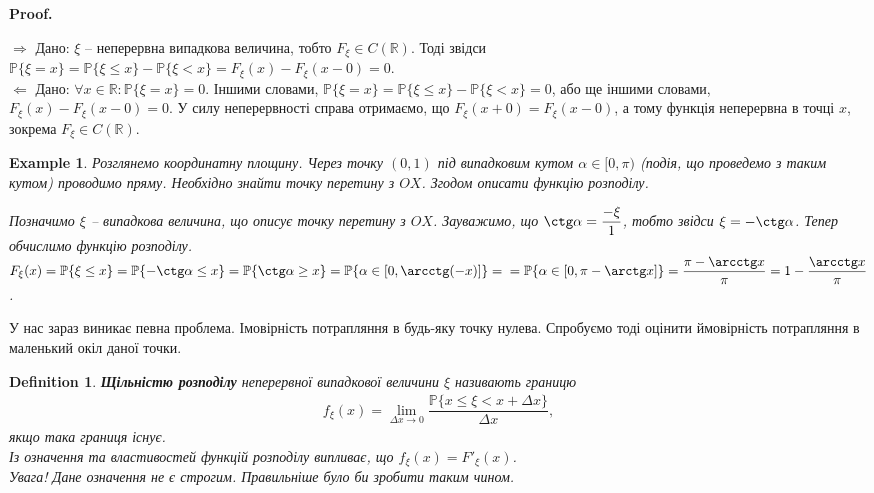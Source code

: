 \documentclass[a4paper, 10pt]{article}
\makeatletter
\def\rightproof{$\boxed{\Rightarrow}$ }
\def\leftproof{$\boxed{\Leftarrow}$ }
\theoremstyle{theoremdd}
\newtheorem{definition}[theorem]{Definition}
\newtheorem{example}[theorem]{Example}
\renewenvironment{proof}[1][Proof.\\]{\par
\pushQED{\hfill \qed}%
\normalfont \topsep6\p@\@plus6\p@\relax
\trivlist
\item\relax
{\bfseries
#1\@addpunct{.}}\hspace\labelsep\ignorespaces
}{%
\popQED\endtrivlist\@endpefalse
}
\makeatother
\begin{document}
\begin{proof}
\rightproof Дано: $\xi$ -- неперервна випадкова величина, тобто $F_\xi \in C(\mathbb{R})$. Тоді звідси \\
$\mathbb{P}\{\xi = x\} = \mathbb{P}\{\xi \leq x\} - \mathbb{P}\{\xi < x\} = F_\xi(x) - F_\xi(x-0) = 0$.
\bigskip \\
\leftproof Дано: $\forall x \in \mathbb{R}: \mathbb{P}\{\xi = x\} = 0$. Іншими словами, $\mathbb{P}\{\xi = x\} = \mathbb{P}\{\xi \leq x\} - \mathbb{P}\{\xi < x\} = 0$, або ще іншими словами, $F_\xi(x) - F_\xi(x-0) = 0$. У силу неперервності справа отримаємо, що $F_\xi(x+0) = F_\xi(x-0)$, а тому функція неперервна в точці $x$, зокрема $F_\xi \in C(\mathbb{R})$.
\end{proof}

\begin{example}
Розглянемо координатну площину. Через точку $(0,1)$ під випадковим кутом $\alpha \in [0,\pi)$ (подія, що проведемо з таким кутом) проводимо пряму. Необхідно знайти точку перетину з $OX$. Згодом описати функцію розподілу.
\begin{figure}[H]
\centering
{}
\end{figure}
\noindent Позначимо $\xi$ -- випадкова величина, що описує точку перетину з $OX$. Зауважимо, що $\ctg \alpha = \dfrac{-\xi}{1}$, тобто звідси $\xi = -\ctg \alpha$. Тепер обчислимо функцію розподілу.\\
$F_\xi(x) = \mathbb{P}\{\xi \leq x\} = \mathbb{P}\{-\ctg \alpha \leq x\} = \mathbb{P}\{\ctg \alpha \geq x\} = \mathbb{P}\{\alpha \in [0,\arcctg(-x)]\} = \\ = \mathbb{P}\{\alpha \in [0,\pi-\arctg x]\} = \dfrac{\pi - \arcctg x}{\pi} = 1 - \dfrac{\arcctg x}{\pi}$.
\end{example}
\noindent
У нас зараз виникає певна проблема. Імовірність потрапляння в будь-яку точку нулева. Спробуємо тоді оцінити ймовірність потрапляння в маленький окіл даної точки.

\begin{definition}
\textbf{Щільністю розподілу} неперервної випадкової величини $\xi$ називають границю
\begin{align*}
f_\xi(x) = \lim_{\Delta x \to 0} \dfrac{\mathbb{P}\{x \leq \xi < x + \Delta x\}}{\Delta x},
\end{align*}
якщо така границя існує.\\
Із означення та властивостей функцій розподілу випливає, що $f_\xi(x) = F'_\xi(x)$.\\
\textit{Увага! Дане означення не є строгим. Правильніше було би зробити таким чином.}
\end{definition}
\end{document}
